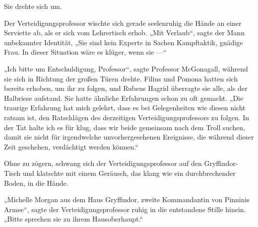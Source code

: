 Sie drehte sich um.

Der Verteidigungsprofessor wischte sich gerade seelenruhig die Hände an einer Serviette ab, als er sich vom Lehrertisch erhob.
„Mit Verlaub“, sagte der Mann unbekannter Identität,
„Sie sind kein Experte in Sachen Kampftaktik, gnädige Frau. In dieser Situation wäre es klüger, wenn sie —“

„Ich bitte um Entschuldigung, Professor“, sagte Professor McGonagall, während sie sich in Richtung der großen Türen drehte. Filius und Pomona hatten sich bereits erhoben, um ihr zu folgen, und Rubeus Hagrid überragte sie alle, als der Halbriese aufstand. Sie hatte ähnliche Erfahrungen schon zu oft gemacht.
„Die traurige Erfahrung hat mich gelehrt, dass es bei Gelegenheiten wie diesen nicht ratsam ist, den Ratschlägen des derzeitigen Verteidigungsprofessors zu folgen. In der Tat halte ich es für klug, dass wir beide gemeinsam nach dem Troll suchen, damit sie nicht für irgendwelche unvorhergesehenen Ereignisse, die während dieser Zeit geschehen, verdächtigt werden können.“

Ohne zu zögern, schwang sich der Verteidigungsprofessor auf den Gryffindor-Tisch und klatschte mit einem Geräusch, das klang wie ein durchbrechender Boden, in die Hände.

„Michelle Morgan aus dem Haus Gryffindor, zweite Kommandantin von Pinninis Armee“, sagte der Verteidigungsprofessor ruhig in die entstandene Stille hinein.
„Bitte sprechen sie zu ihrem Hausoberhaupt.“

